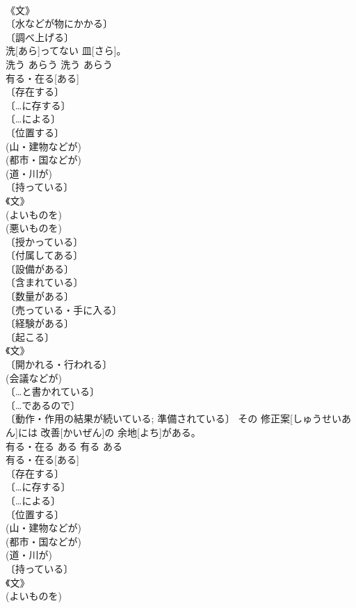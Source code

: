 \documentclass[8pt]{extreport}
\begin{document}
\begin{CJK}{UTF8}{min}
\\	《文》 
\\	〔水などが物にかかる〕 
\\	〔調べ上げる〕 
\\	洗[あら]ってない 皿[さら]。	
\\	洗う	あらう	洗う	あらう	
\\	有る・在る[ある]	
\\	〔存在する〕 
\\	〔…に存する〕 
\\	〔…による〕 
\\	〔位置する〕 
\\	(山・建物などが) 
\\	(都市・国などが) 
\\	(道・川が) 
\\	〔持っている〕 
\\	《文》 
\\	(よいものを) 
\\	(悪いものを) 
\\	〔授かっている〕 
\\	〔付属してある〕 
\\	〔設備がある〕 
\\	〔含まれている〕 
\\	〔数量がある〕 
\\	〔売っている・手に入る〕 
\\	〔経験がある〕 
\\	〔起こる〕 
\\	《文》 
\\	〔開かれる・行われる〕 
\\	(会議などが) 
\\	〔…と書かれている〕 
\\	〔…であるので〕 
\\	〔動作・作用の結果が続いている; 準備されている〕	その 修正案[しゅうせいあん]には 改善[かいぜん]の 余地[よち]がある。	
\\	有る・在る	ある	有る	ある	
\\	有る・在る[ある]	
\\	〔存在する〕 
\\	〔…に存する〕 
\\	〔…による〕 
\\	〔位置する〕 
\\	(山・建物などが) 
\\	(都市・国などが) 
\\	(道・川が) 
\\	〔持っている〕 
\\	《文》 
\\	(よいものを) 

\end{CJK}
\end{document}
